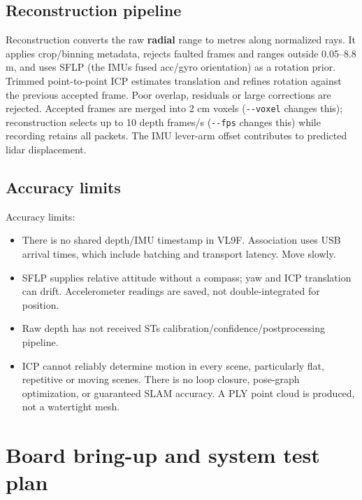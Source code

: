\documentclass[10pt,a4paper,oneside]{report}
\providecommand{\tightlist}{\setlength{\itemsep}{1pt}\setlength{\parskip}{1pt}}
\begin{document}
\section{Reconstruction pipeline}\label{wiki-tools-scene-reconstruction--reconstruction-pipeline}

Reconstruction converts the raw \textbf{radial} range to metres along normalized rays. It applies crop/binning metadata, rejects faulted frames and ranges outside 0.05--8.8 m, and uses SFLP (the IMU\textquotesingle s fused acc/gyro orientation) as a rotation prior. Trimmed point-to-point ICP estimates translation and refines rotation against the previous accepted frame. Poor overlap, residuals or large corrections are rejected. Accepted frames are merged into 2 cm voxels (\texttt{-\allowbreak{}-\allowbreak{}voxel} changes this); reconstruction selects up to 10 depth frames/s (\texttt{-\allowbreak{}-\allowbreak{}fps} changes this) while recording retains all packets. The IMU lever-arm offset contributes to predicted lidar displacement.

\section{Accuracy limits}\label{wiki-tools-scene-reconstruction--accuracy-limits}

Accuracy limits:

\begin{itemize}
\tightlist
\item
  There is no shared depth/IMU timestamp in VL9F. Association uses USB arrival times, which include batching and transport latency. Move slowly.
\item
  SFLP supplies relative attitude without a compass; yaw and ICP translation can drift. Accelerometer readings are saved, not double-integrated for position.
\item
  Raw depth has not received ST\textquotesingle s calibration/confidence/postprocessing pipeline.
\item
  ICP cannot reliably determine motion in every scene, particularly flat, repetitive or moving scenes. There is no loop closure, pose-graph optimization, or guaranteed SLAM accuracy. A PLY point cloud is produced, not a watertight mesh.
\end{itemize}

\chapter{Board bring-up and system test plan}\label{wiki-hardware-bring-up-and-testing--magnecko-sense-mgs--bring-up--system-test-protocol}
\end{document}
